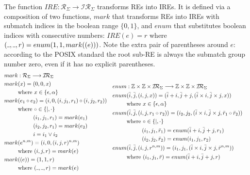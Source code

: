 \documentclass[AMA,STIX1COL]{WileyNJD-v2}
\newcommand{\Xund}{\rule{.4em}{.4pt}}
\newcommand{\XI}{\mathcal{I}}
\newcommand{\XIR}{\XI\!\XR}
\newcommand{\XR}{\mathcal{R}}
\newcommand{\YZ}{\mathbb{Z}}
\newcommand{\IRE}{I\!RE}
\begin{document}
The function $\IRE : \XR_\Sigma \rightarrow \XIR_\Sigma$ transforms REs into IREs.
It is defined via a composition of two functions,
$mark$ that transforms REs into IREs with submatch indices in the boolean range $\{0, 1\}$,
and $enum$ that substitutes boolean indices with consecutive numbers:
$\IRE(e) = r$ where $(\Xund, \Xund, r) = enum(1, 1, mark((e)))$.
Note the extra pair of parentheses around $e$:
according to the POSIX standard the root sub-RE is always the submatch group number zero,
even if it has no explicit parentheses.
    \begin{align*}
    &\begin{aligned}
        mark &: \XR_\Sigma \longrightarrow \XIR_\Sigma \\
        mark &(x) = (0, 0, x) \\
            &\text{where } x \in \{\epsilon, \alpha\}
        \\
        mark &(e_1 \circ e_2) = (i, 0,
            (i, j_1, r_1) \circ
            (i, j_2, r_2)
            ) \\
            &\text{where } \circ \in \{|,\cdot\} \\
            &\space{\hphantom{where }}(i_1, j_1, r_1) = mark(e_1) \\
            &\space{\hphantom{where }}(i_2, j_2, r_1) = mark(e_2) \\
            &\space{\hphantom{where }}i = i_1 \vee i_2 \\
        mark &(e^{n, m}) = (i, 0, (i, j, r)^{n, m}) \\
            &\text{where } (i, j, r) = mark(e) \\
        mark &((e)) = (1, 1, r) \\
            &\text{where } (\Xund, \Xund, r) = mark(e)
    \end{aligned}
    &&\begin{aligned}
        enum &: \YZ \times \YZ \times \XIR_\Sigma \longrightarrow \YZ \times \YZ \times \XIR_\Sigma \\
        enum &(\bar{i}, \bar{j}, (i, j, x)) = (\bar{i} + i, \bar{j} + j, (\bar{i} \times i, \bar{j} \times j, x)) \\
            &\text{where } x \in \{\epsilon, \alpha\}
        \\
        enum &(\bar{i}, \bar{j}, (i, j, r_1 \circ r_2)) = (i_2, j_2, (\bar{i} \times i, \bar{j} \times j, \bar{r}_1 \circ \bar{r}_2)) \\
            &\text{where } \circ \in \{|,\cdot\} \\
            &\space{\hphantom{where }}(i_1, j_1, \bar{r}_1) = enum(\bar{i} + i, \bar{j} + j, r_1) \\
            &\space{\hphantom{where }}(i_2, j_2, \bar{r}_2) = enum(i_1, j_1, r_2)
        \\
        enum &(\bar{i}, \bar{j}, (i, j, r^{n,m})) = (i_1, j_1, (\bar{i} \times i, \bar{j} \times j, \bar{r}^{n,m})) \\
            &\text{where }
                (i_1, j_1, \bar{r}) = enum(\bar{i} + i, \bar{j} + j, r)
    \end{aligned}
    \end{align*}
\end{document}
